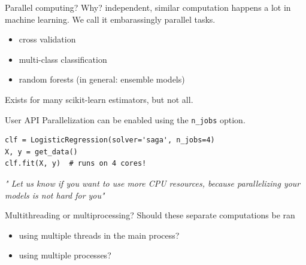 \documentclass[13pt, usenames,dvipsnames]{beamer} %
\begin{document}
    \begin{frame}[t]{Parallel computing? Why?}
        \small
        \vspace{1cm}
        independent, similar computation happens a lot in machine learning. We
        call it embarassingly parallel tasks.
        \vspace{1cm}
        \begin{itemize}
            \item cross validation
            \item multi-class classification
            \item random forests \tiny{(in general: ensemble models)}
        \end{itemize}
        \vspace{1cm}
        \begin{flushright}
            \small
        Exists for many scikit-learn estimators, but not all.
        \end{flushright}
    \end{frame}

    \begin{frame}[fragile]{User API}
        \small
        Parallelization can be enabled using the \verb|n_jobs| option.
        \begin{beamerboxesrounded}{}
            \begin{verbatim}
clf = LogisticRegression(solver='saga', n_jobs=4)
X, y = get_data()
clf.fit(X, y)  # runs on 4 cores!
            \end{verbatim}
        \end{beamerboxesrounded}{}
        \textit{" Let us know if you want to use more CPU resources, because
        parallelizing your models is not hard for you"}
    \end{frame}

    \begin{frame}[fragile]{Multithreading or multiprocessing?}
        Should these separate computations be ran
        \begin{itemize}
            \item using multiple threads in the main process?
            \item using multiple processes?
        \end{itemize}
    \end{frame}
\end{document}
